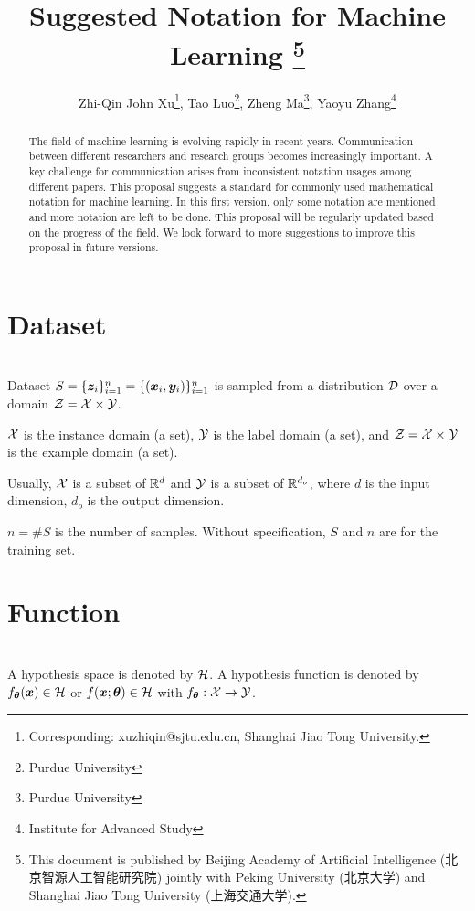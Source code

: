 \documentclass{article}
\begin{document}
\title{Suggested Notation for Machine Learning \thanks{This document is published by Beijing Academy of Artificial Intelligence (北京智源人工智能研究院) jointly with Peking University (北京大学) and Shanghai Jiao Tong University (上海交通大学).}}
\author{Zhi-Qin John Xu\thanks{Corresponding: xuzhiqin@sjtu.edu.cn, Shanghai Jiao Tong University.}, Tao Luo\thanks{Purdue University}, Zheng Ma\thanks{Purdue University}, Yaoyu Zhang\thanks{Institute for Advanced Study}}

\maketitle
\begin{abstract}
    The field of machine learning is evolving rapidly in recent years. Communication between different researchers and research groups becomes increasingly important. A key challenge for communication arises from inconsistent notation usages among different papers. This proposal suggests a standard for commonly used mathematical notation for machine learning. In this first version, only some notation are mentioned and more notation are left to be done. This proposal will be regularly updated based on the progress of the field. We look forward to more suggestions to improve this proposal in future versions.
\end{abstract}

\tableofcontents

\section{Dataset}~\\
Dataset  $S=\{\bm{z}_i\}_{i=1}^n=\{(\bm{x}_i,\bm{y}_i)\}_{i=1}^n$ is sampled from a distribution $\mathcal{D}$ over a domain $\mathcal{Z}=\mathcal{X}\times\mathcal{Y}$.

$\mathcal{X}$  is the instance domain (a set), $\mathcal{Y}$ is the label domain (a set), and $\mathcal{Z}=\mathcal{X}\times\mathcal{Y}$ is the example domain (a set).

Usually,
$\mathcal{X}$ is a subset of $\mathbb{R}^d$ and $\mathcal{Y}$ is a subset of $\mathbb{R}^{d_{o}}$, where $d$ is the input dimension, $d_{o}$ is the output dimension.

$n=\#S$ is the number of samples. Without specification, $S$ and $n$ are for the training set.

\section{Function}~\\
A hypothesis space is denoted by $\mathcal{H}$. A hypothesis function is denoted by $f_{\bm{\theta}}(\bm{x})\in\mathcal{H}$ or $f(\bm{x};\bm{\theta})\in\mathcal{H}$ with $f_{\bm{\theta}}:\mathcal{X}\to\mathcal{Y}$.
\end{document}
